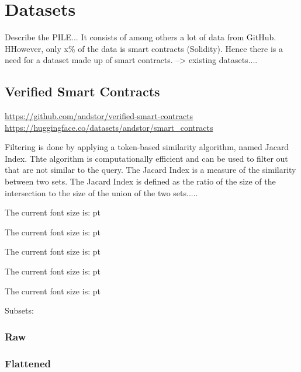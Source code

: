 \section{Datasets}
Describe the  PILE...  It consists  of among others a lot of data from GitHub. HHowever, only x\% of the data is smart contracts (Solidity). Hence there is a need  for a dataset made up of smart contracts. --> existing datasets....

\subsection{Verified Smart Contracts}
\label{sec:verified-smart-contracts}
\url{https://github.com/andstor/verified-smart-contracts}
\url{https://huggingface.co/datasets/andstor/smart_contracts}


Filtering is done by applying a token-based similarity algorithm, named Jacard Index. Thte algorithm  is computationally efficient and can be used to filter out  that are not similar to the query. The Jacard Index is a measure of the similarity between two sets. The Jacard Index is defined as the ratio of the size of the intersection to the size of the union of the two sets.....

\makeatletter
\newcommand\thefontsize[1]{{#1 The current font size is: \f@size pt\par}}
\makeatother

\thefontsize\tiny
\thefontsize\footnotesize
\thefontsize\small
\thefontsize\normalsize
\thefontsize\large

\tmp\tmp

\tmp\tmp

\tmp\tmp

\prntlen{\textwidth}

Subsets:
\subsubsection{Raw}
\label{sec:verified-smart-contracts-raw}

\subsubsection{Flattened}
\label{sec:verified-smart-contracts-flattened}

